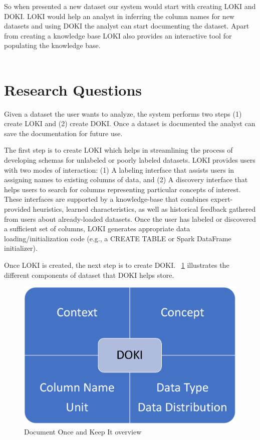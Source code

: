 \documentclass{vldb}
\begin{document}
So when presented a new dataset our system would start with creating LOKI and DOKI. LOKI would help an analyst in inferring the column names for new datasets and using DOKI the analyst can start documenting the dataset. Apart from creating a knowledge base LOKI also provides an interactive tool for populating the knowledge base.\\
\\

\section{Research Questions}
Given a dataset the user wants to analyze, the system performs two steps (1) create LOKI and (2) create DOKI. Once a dataset is documented the analyst can save the documentation for future use.  

The first step is to create LOKI which helps in streamlining the process of developing schemas for unlabeled or poorly labeled datasets. LOKI provides users with two modes of interaction: (1) A labeling interface that assists users in assigning names to existing columns of data, and (2) A discovery interface that helps users to search for columns representing particular concepts of interest. These interfaces are supported by a knowledge-base that combines expert-provided heuristics, learned characteristics, as well as historical feedback gathered from users about already-loaded datasets. Once the user has labeled or discovered a sufficient set of columns, LOKI generates appropriate data loading/initialization code (e.g., a CREATE TABLE or Spark DataFrame initializer).

Once LOKI is created, the next step is to create DOKI. ~\ref{fig:DOKI} illustrates the different components of dataset that DOKI helps store.

\begin{figure}[h]
	\centering
	\includegraphics[width=0.8\columnwidth]{graphics/DOKI.pdf}
	\caption{Document Once and Keep It overview}
	\label{fig:DOKI}
	\vspace*{-1mm}
\end{figure}
\end{document}
